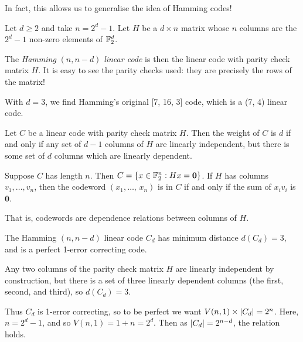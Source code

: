 \documentclass{article}
\begin{document}
In fact, this allows us to generalise the idea of Hamming codes!

\begin{definition}
    Let $d \geq 2$ and take $n = 2^d - 1$. Let $H$ be a $d \times n$ matrix whose $n$ columns are the $2^d-1$ non-zero elements of $\mathbb{F}_2^d$.
    
    The \textit{Hamming} $(n, n-d)$ \textit{linear code} is then the  linear code with parity check matrix $H$. It is easy to see the parity checks used: they are precisely the rows of the matrix!
\end{definition}

\begin{note}
	With $d = 3$, we find Hamming's original [7, 16, 3] code, which is a (7, 4) linear code.
\end{note}

\begin{proposition}
    Let $C$ be a linear code with parity check matrix $H$. Then the weight of $C$ is $d$ if and only if any set of $d-1$ columns of $H$ are linearly independent, but there is some set of $d$ columns which are linearly dependent.
\end{proposition}

\begin{prf}
    Suppose $C$ has length $n$. Then $C = \left\lbrace x \in \mathbb{F}_2^n : Hx = \mathbf{0} \right\rbrace$. If $H$ has columns $v_1, \dots, v_n$, then the codeword $(x_1, \dots, \, x_n)$ is in $C$ if and only if the sum of $x_iv_i$ is $\mathbf{0}$.
    
    That is, codewords are dependence relations between columns of $H$.
\end{prf}

\begin{corollary}
    The Hamming $(n, n-d)$ linear code $C_d$ has minimum distance $d(C_d) = 3$, and is a perfect 1-error correcting code.
\end{corollary}

\begin{prf}
    Any two columns of the parity check matrix $H$ are linearly independent by construction, but there is a set of three linearly dependent columns (the first, second, and third), so $d(C_d) = 3$.
    
    Thus $C_d$ is 1-error correcting,
    so to be perfect we want $V(n, 1) \times \left\lvert C_d \right\rvert = 2^n$.
    Here, $n = 2^d-1$, and so $V(n, 1) = 1+n = 2^d$.
    Then as $\left\lvert C_d \right\rvert = 2^{n-d}$, the relation holds.
\end{prf}
\end{document}
